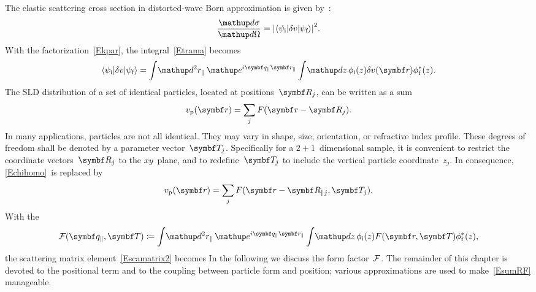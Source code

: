 The elastic scattering cross section
in distorted-wave Born approximation
is given by~:
\begin{equation}\label{Exsection2}
  \frac{\d\sigma}{\d\Omega}
  =  {\left|\bra\psi_\ti|\delta v|\psi_\tf\ket\right|}^2.
\end{equation}
With the factorization~\cref{Ekpar},
the integral~\cref{Etrama} becomes
\begin{equation}\label{Escamatrix2}
  \bra\psi_\ti|\delta v|\psi_\tf\ket
  = \int\!\d^2 r_\parallel\, \e^{i\q_\parallel \r_\parallel}
    \int\!\d z\, \phi_\si(z) \delta v(\r) \phi^*_\sf(z).
\end{equation}
The SLD distribution of a set of identical particles,
located at positions~$\R_j$, can be written as a sum
\begin{equation}\label{Echihomo}
  v_\sp(\r) = \sum_j F(\r-\R_j).
\end{equation}
In many applications,
particles are not all identical.
They may vary in shape, size, orientation, or refractive index profile.
These degrees of freedom
shall be denoted by a parameter vector~$\v{T}_j$.
Specifically for a $2+1$~dimensional sample,
it is convenient to restrict the coordinate vectors~$\R_j$ to the $xy$~plane,
and to redefine~$\v{T}_j$ to include the vertical particle coordinate~$z_j$.
In consequence, \cref{Echihomo}~is replaced by
\begin{equation}\label{Echihetero}
  v_\sp(\r) = \sum_j F(\r-\R_{\parallel j},\v{T}_j).
\end{equation}
With the 
\begin{equation}\label{EcFdef}
  {\cal F}(\q_\parallel,\v{T})
  \coloneqq
    \int\!\d^2 r_\parallel\, \e^{i\q_\parallel \r_\parallel}
    \int\!\d z\, \phi_\si(z) F(\r,\v{T}) \phi^*_\sf(z),
\end{equation}
the scattering matrix element~\cref{Escamatrix2} becomes
In the following  we discuss the form factor~${\cal F}$.
The remainder of this chapter is devoted to the
positional term and to the coupling between particle form and position;
various approximations are used to make~\cref{EsumRF} manageable.

